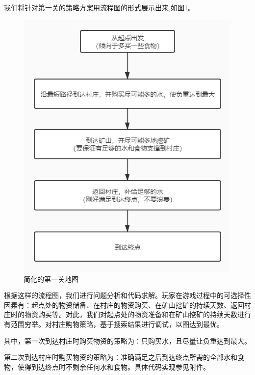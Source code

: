 \documentclass[withoutpreface,bwprint]{cumcmthesis} %
\begin{document}
我们将针对第一关的策略方案用流程图的形式展示出来,如图\ref{fig:map1lc}。
\begin{figure}[h]
	\centering
	\includegraphics[scale=0.4]{figures/map1liuchengtu}
	\caption{简化的第一关地图}
	\label{fig:map1lc}
\end{figure}
根据这样的流程图，我们进行问题分析和代码求解。玩家在游戏过程中的可选择性因素有：起点处的物资储备、在村庄的物资购买、在矿山挖矿的持续天数、返回村庄时的物资购买等。对此，我们对起点处的物资准备和在矿山挖矿的持续天数进行有范围穷举。对村庄购物策略，基于搜索结果进行调试，以图达到最优。

其中，第一次到达村庄时购买物资的策略为：只购买水，且尽量让负重达到最大。

第二次到达村庄时购买物资的策略为：准确满足之后到达终点所需的全部水和食物，使得到达终点时不剩余任何水和食物。具体代码实现参见附件。\\
\end{document}
